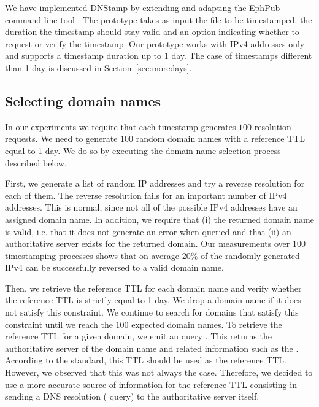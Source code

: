 \label{sec:implem}

We have implemented DNStamp by extending and adapting the EphPub command-line tool \cite{Castelluccia2011}. The prototype takes as input the file to be timestamped, the duration the timestamp should stay valid and an option indicating whether to request or verify the timestamp. Our prototype works with IPv4 addresses only and supports a timestamp duration up to 1 day. The case of timestamps
different than 1 day is discussed in Section~\ref{sec:moredays}.

\subsection{Selecting domain names}
\label{sec:domainselection}

In our experiments we require that each timestamp generates $100$ resolution requests. We need to generate $100$ random domain names with a reference TTL equal to 1 day. We do so by executing the domain name selection process described below.

First, we generate a list of random IP addresses and try a reverse resolution for each of them. The reverse resolution fails for an important number of IPv4 addresses. This is normal, since not all of the possible IPv4 addresses have an assigned domain name. In addition, we require that (i) the returned domain name is valid, i.e. that it does not generate an  error \cite{Mockapetris1987} when queried and that (ii) an authoritative server exists for the returned domain. Our measurements over 100 timestamping processes shows that on average $20\%$ of the randomly generated IPv4 can be successfully reversed to a valid domain name.

Then, we retrieve the reference TTL for each domain name and verify whether the reference TTL is strictly equal to 1 day. We drop a domain name if it does not satisfy this constraint. We continue to search for domains that satisfy this constraint until we reach the $100$ expected domain names.
To retrieve the reference TTL for a given domain, we emit an  query \cite{Mockapetris1987}. This returns the authoritative server of the domain name and related information such as the . According to the standard, this TTL should be used as the reference TTL. However, we observed that this was not always the case. Therefore, we decided to use a more accurate source of information for the reference TTL consisting in sending a DNS resolution ( query) to the authoritative server itself. 

